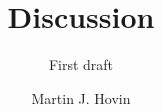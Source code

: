 \documentclass[a4paper,english]{report}
\author{Martin J. Hovin}
\begin{document}
\title{Discussion}
\subtitle{First draft}

\maketitle


\end{document}
